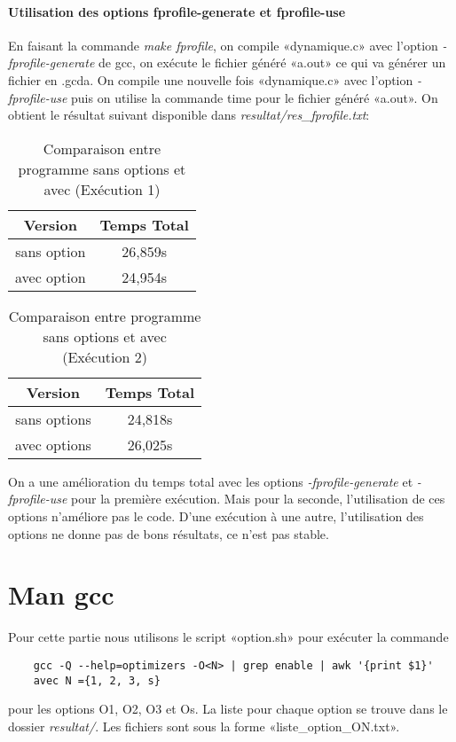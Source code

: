 \documentclass{rapport}
\begin{document}
\subsection{Utilisation des options fprofile-generate et fprofile-use}
En faisant la commande \textit{make fprofile}, on compile «dynamique.c» avec l'option \textit{-fprofile-generate} de gcc, on exécute le fichier généré «a.out» ce qui va générer un fichier en .gcda. On compile une nouvelle fois «dynamique.c» avec l'option \textit{-fprofile-use} puis on utilise la commande time pour le fichier généré «a.out».
\newline
On obtient le résultat suivant disponible dans \textit{resultat/res\_fprofile.txt}:
\begin{table}[h!]
    \centering
    \begin{tabular}{|c|c|}
        \hline
        Version & Temps Total \\
        \hline
        sans option & 26,859s \\
        \hline
        avec option &  24,954s\\
        \hline
    \end{tabular}
    \caption{Comparaison entre programme sans options et avec (Exécution 1)}
\end{table}
\begin{table}[h!]
    \centering
    \begin{tabular}{|c|c|}
        \hline
        Version & Temps Total \\
        \hline
        sans options & 24,818s \\
        \hline
        avec options &  26,025s \\
        \hline
    \end{tabular}
    \caption{Comparaison entre programme sans options et avec (Exécution 2)}
\end{table}
\newline
On a une amélioration du temps total avec les options \textit{-fprofile-generate} et \textit{-fprofile-use} pour la première exécution. Mais pour la seconde, l'utilisation de ces options n'améliore pas le code. D'une exécution à une autre, l'utilisation des options ne donne pas de bons résultats, ce n'est pas stable.
\clearpage
\part{Man gcc}
Pour cette partie nous utilisons le script «option.sh» pour exécuter la commande
\begin{lstlisting}
    gcc -Q --help=optimizers -O<N> | grep enable | awk '{print $1}'
    avec N ={1, 2, 3, s}
\end{lstlisting}
pour les options O1, O2, O3 et Os. La liste pour chaque option se trouve dans le dossier \textit{resultat/}. Les fichiers sont sous la forme «liste\_option\_ON.txt».
\end{document}
